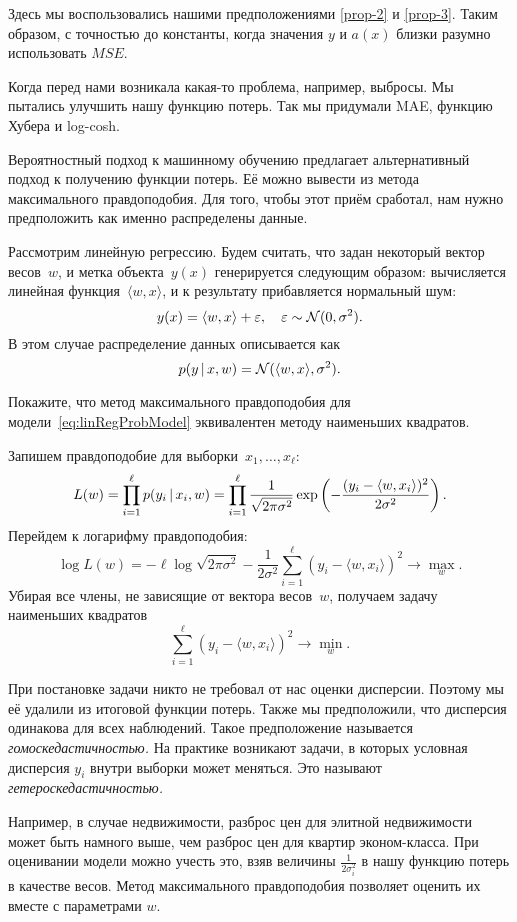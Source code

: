 \documentclass[12pt,fleqn]{article}
\begin{document}
Здесь мы воспользовались нашими предположениями \ref{prop-2} и \ref{prop-3}. Таким образом,
с точностью до константы, когда значения $y$ и $a(x)$ близки разумно использовать $MSE.$

Когда перед нами возникала какая-то проблема, например, выбросы. Мы пытались улучшить нашу функцию потерь. Так мы придумали MAE, функцию Хубера и log-cosh. 

Вероятностный подход к машинному обучению предлагает альтернативный подход к получению функции потерь. Её можно вывести из метода максимального правдоподобия. Для того, чтобы этот приём сработал, нам нужно предположить как именно распределены данные. 

Рассмотрим линейную регрессию. Будем считать, что задан некоторый вектор весов~$w$, и метка объекта~$y(x)$ генерируется следующим образом: вычисляется линейная функция~$\langle w, x \rangle$, и к результату прибавляется нормальный шум:
\[
    y(x) = \langle w, x \rangle + \varepsilon,
    \quad
    \varepsilon \sim \mathcal{N}(0, \sigma^2).
\]
В этом случае распределение данных описывается как
\begin{equation}
\label{eq:linRegProbModel}
    p(y \mspace{3mu}{|}\mspace{3mu} x, w)
    =
    \mathcal{N}(\langle w, x \rangle, \sigma^2).
\end{equation}

\begin{vkProblem}
    Покажите, что метод максимального правдоподобия для
    модели~\eqref{eq:linRegProbModel} эквивалентен
    методу наименьших квадратов.
\end{vkProblem}

\begin{esSolution}
    Запишем правдоподобие для выборки~$x_1, \dots, x_\ell$:
    \[
        L(w)
        =
        \prod_{i = 1}^{\ell} p(y_i \mspace{3mu}{|}\mspace{3mu} x_i, w)
        =
        \prod_{i = 1}^{\ell}
            \frac{1}{\sqrt{2 \pi \sigma^2}}
            \exp\left(
                - \frac{(y_i - \langle w, x_i \rangle)^2}{2 \sigma^2}
            \right).
    \]
    Перейдем к логарифму правдоподобия:
    \[
        \log L(w)
        =
        -\ell \log \sqrt{2 \pi \sigma^2} -
        \frac{1}{2 \sigma^2} \sum_{i = 1}^{\ell} (y_i - \langle w, x_i \rangle)^2
        \to \max_w.
    \]
    Убирая все члены, не зависящие от вектора весов~$w$,
    получаем задачу наименьших квадратов
    \[
        \sum_{i = 1}^{\ell} (y_i - \langle w, x_i \rangle)^2 \to \min_w.
    \]
    
    При постановке задачи никто не требовал от нас оценки дисперсии. Поэтому мы её удалили из итоговой функции потерь. Также мы предположили, что дисперсия одинакова для всех наблюдений. Такое предположение называется \emph{гомоскедастичностью.} На практике возникают задачи, в которых условная дисперсия $y_i$ внутри выборки может меняться. Это называют \emph{гетероскедастичностью.} 
    
    Например, в случае недвижимости, разброс цен для элитной недвижимости может быть намного выше, чем разброс цен для квартир эконом-класса. При оценивании модели можно учесть это, взяв величины $\frac{1}{2\sigma^2_i}$ в нашу функцию потерь в качестве весов. Метод максимального правдоподобия позволяет оценить их вместе с параметрами $w$.
\end{esSolution}
\end{document}
